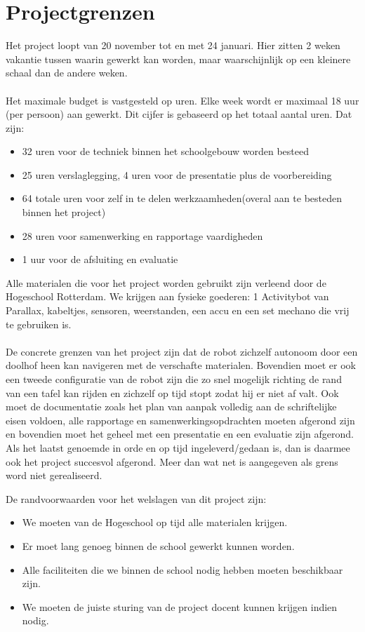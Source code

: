 \documentclass[oneside]{book}
\begin{document}
\clearpage
\chapter{Projectgrenzen}
Het project loopt van 20 november tot en met 24 januari. Hier zitten 2 weken vakantie tussen
waarin gewerkt kan worden, maar waarschijnlijk op een kleinere schaal dan de andere weken.\\
\\
Het maximale budget is vastgesteld op uren. Elke week wordt er maximaal 18 uur (per persoon) aan
gewerkt.
Dit cijfer is gebaseerd op het totaal aantal uren.
Dat zijn: 
\begin{itemize}
\item 32 uren voor de techniek binnen het schoolgebouw worden besteed
\item 25 uren verslaglegging, 4 uren voor de presentatie plus de voorbereiding
\item 64 totale uren voor zelf in te delen werkzaamheden(overal aan te besteden binnen het project)
\item 28 uren voor samenwerking en rapportage vaardigheden  
\item 1 uur voor de afsluiting en evaluatie
\end{itemize}
Alle materialen die voor het project worden gebruikt zijn verleend door de Hogeschool
Rotterdam.
We krijgen aan fysieke goederen: 1 Activitybot van Parallax, kabeltjes, sensoren, weerstanden, een
accu en een set mechano die vrij te gebruiken is.\\
\\
De concrete grenzen van het project zijn dat de robot zichzelf
autonoom door een doolhof heen kan navigeren met
de verschafte materialen. 
Bovendien moet er ook een tweede configuratie van de robot zijn die zo snel
mogelijk richting de rand van een tafel kan rijden en zichzelf op tijd stopt zodat hij er niet af valt.
Ook moet de documentatie zoals het plan van aanpak volledig aan de schriftelijke eisen voldoen, alle rapportage
en samenwerkingsopdrachten moeten
afgerond zijn en bovendien moet het geheel met een presentatie en een evaluatie zijn afgerond.
Als het laatst genoemde in orde en op tijd ingeleverd/gedaan is, dan is daarmee ook het project
succesvol afgerond.
Meer dan wat net is aangegeven als grens word niet gerealiseerd.

De randvoorwaarden voor het welslagen van dit project zijn: 
\begin{itemize}
\item We moeten van de Hogeschool op tijd alle materialen krijgen.
\item Er moet lang genoeg binnen de school gewerkt kunnen worden.
\item Alle faciliteiten die we binnen de school nodig hebben moeten beschikbaar zijn.
\item We moeten de juiste sturing van de project docent kunnen krijgen indien nodig.
\end{itemize}
\clearpage
\end{document}
